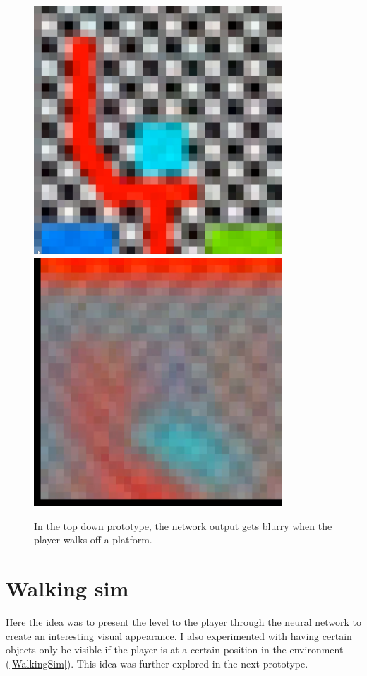 \begin{figure}[p]
  \centering
  \includegraphics[width=0.83\textwidth]{images/workflow/TopDownOn.png} \\[\picVdist]
  \includegraphics[width=0.83\textwidth]{images/workflow/TopDownOff.png}
  \caption{In the top down prototype, the network output gets blurry when the player walks off a platform.}
  \label{WalkOffPlatform}
\end{figure}


\section{Walking sim}
Here the idea was to present the level to the player through the neural network to create an interesting visual appearance. I also experimented with having certain objects only be visible if the player is at a certain position in the environment (\cref{WalkingSim}). This idea was further explored in the next prototype.

